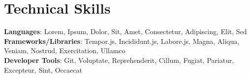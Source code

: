 \section{Technical Skills}
 \begin{itemize}[leftmargin=0.15in, label={}]
    \small{\item{
     \textbf{Languages}{: Lorem, Ipsum, Dolor, Sit, Amet, Consectetur, Adipiscing, Elit, Sed} \\
     \textbf{Frameworks/Libraries}{: Tempor.js, Incididunt.js, Labore.js, Magna, Aliqua, Veniam, Nostrud, Exercitation, Ullamco} \\
     \textbf{Developer Tools}{: Git, Voluptate, Reprehenderit, Cillum, Fugiat, Pariatur, Excepteur, Sint, Occaecat} \\
    }}
 \end{itemize}
 \sectionGap
